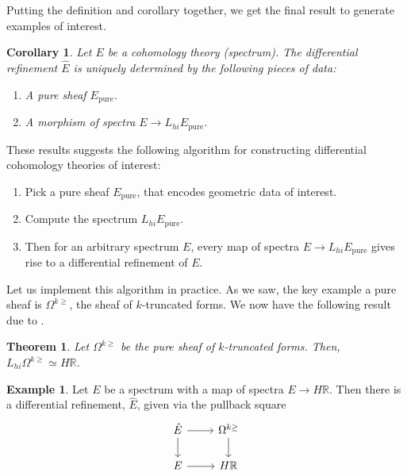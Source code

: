 \documentclass[a4paper]{book}
\newcommand{\bR}{\mathbb{R}}
\newtheorem{theorem}[equation]{Theorem}
\newtheorem{corollary}[equation]{Corollary}
\theoremstyle{definition}
\newtheorem{example}[equation]{Example}
\theoremstyle{remark}
\numberwithin{equation}{section}
\begin{document}
Putting the definition and corollary together, we get the final result to generate examples of interest.

\begin{corollary}
 Let $E$ be a cohomology theory (spectrum). The differential refinement $\hat{E}$ is uniquely determined by the following pieces of data:
\begin{enumerate}
  \item A pure sheaf $E_{\mathrm{pure}}$.
  \item A morphism of spectra $E \to L_{hi}E_{\mathrm{pure}}$.
\end{enumerate}
\end{corollary}

These results suggests the following algorithm for constructing differential cohomology theories of interest:
\begin{enumerate}
  \item Pick a pure sheaf $E_{\mathrm{pure}}$, that encodes geometric data of interest.
  \item Compute the spectrum $L_{hi}E_{\mathrm{pure}}$.
  \item Then for an arbitrary spectrum $E$, every map of spectra $E \to L_{hi}E_{\mathrm{pure}}$ gives rise to a differential refinement of $E$.
\end{enumerate}

Let us implement this algorithm in practice. As we saw, the key example a pure sheaf is $\Omega^{k \geq}$, the sheaf of $k$-truncated forms. We now have the following result due to \cite{bunkenikolausvoelkl2016diffcoh}.

\begin{theorem}
  Let $\Omega^{k \geq}$ be the pure sheaf of $k$-truncated forms. Then, $L_{hi}\Omega^{k \geq} \simeq H\bR$. 
\end{theorem}

\begin{example}
 Let $E$ be a spectrum with a map of spectra $E \to H\bR$. Then there is a differential refinement, $\hat{E}$, given via the pullback square 
 \[ 
 \begin{tikzcd}
 \hat{E} \arrow{r} \arrow{d} & \Omega^{k \geq}  \arrow{d} \\
 E \arrow{r} & H\bR
 \end{tikzcd}
 \]
\end{example}
\end{document}
